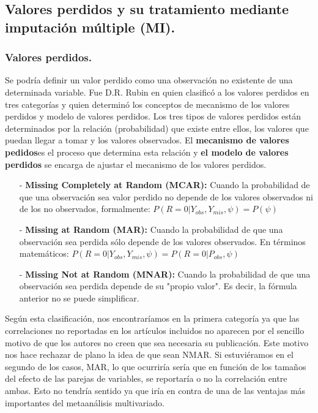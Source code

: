 \documentclass[a4paper,openright,12pt]{report}
\begin{document}
\subsection{Valores perdidos y su tratamiento mediante imputación múltiple (MI).}

\subsubsection{Valores perdidos.}

Se podría definir un valor perdido como una observación no existente de una determinada variable. Fue D.R. Rubin en \cite{Rubin1976} quien clasificó a los valores perdidos en tres categorías y quien determinó los conceptos de mecanismo de los valores perdidos y modelo de valores perdidos. Los tres tipos de valores perdidos están determinados por la relación (probabilidad) que existe entre ellos, los valores que puedan llegar a tomar y los valores observados. El \textbf{mecanismo de valores pedidos}es el proceso que determina esta relación y \textbf{el modelo de valores perdidos} se encarga de ajustar el mecanismo de los valores perdidos.
\begin{itemize}
\item[-] \textbf{Missing Completely at Random (MCAR):} Cuando la probabilidad de que una observación sea valor perdido no depende de los valores observados ni de los no observados, formalmente: $P(R=0 \vert Y_{obs},Y_{mis},\psi)=P(\psi)$ 
\item[-] \textbf{Missing at Random (MAR):} Cuando la probabilidad de que una observación sea perdida sólo depende de los valores observados. En términos matemáticos: $P(R=0\vert Y_{obs},Y_{mis},\psi)=P(R=0\vert P_{obs},\psi)$
\item[-] \textbf{Missing Not at Random (MNAR):} Cuando la probabilidad de que una observación sea perdida depende de su "propio valor". Es decir, la fórmula anterior no se puede simplificar.
\end{itemize}

Según esta clasificación, nos encontraríamos en la primera categoría ya que las correlaciones no reportadas en los artículos incluidos no aparecen por el sencillo motivo de que los autores no creen que sea necesaria su publicación. Este motivo nos hace rechazar de plano la idea de que sean NMAR. Si estuviéramos en el segundo de los casos, MAR, lo que ocurriría sería que en función de los tamaños del efecto de las parejas de variables, se reportaría o no la correlación entre ambas. Esto no tendría sentido ya que iría en contra de una de las ventajas más importantes del metaanálisis multivariado.
\end{document}
